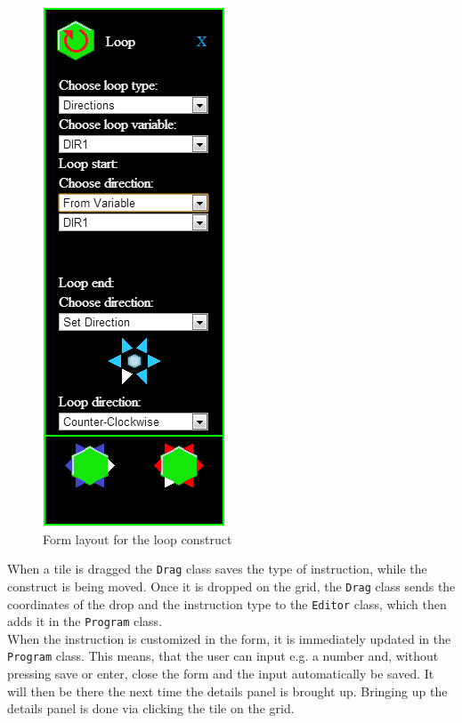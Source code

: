 \begin{figure}[ht]
\begin{center}
\includegraphics[scale=0.5]{img/editor_loop_form.png}
\caption{Form layout for the loop construct}
\label{fig:form_layout}
\end{center}
\end{figure}

When a tile is dragged the \texttt{Drag} class saves the type of instruction, while the construct is being moved.
Once it is dropped on the grid, the \texttt{Drag} class sends the coordinates of the drop and the instruction type to the \texttt{Editor} class, which then adds it in the \texttt{Program} class.\\

When the instruction is customized in the form, it is immediately updated in the \texttt{Program} class.
This means, that the user can input e.g. a number and, without pressing save or enter, close the form and the input automatically be saved.
It will then be there the next time the details panel is brought up.
Bringing up the details panel is done via clicking the tile on the grid.

